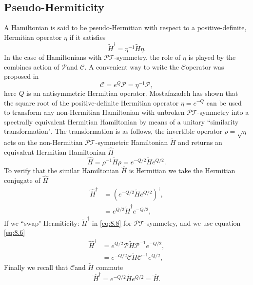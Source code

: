 \documentclass[12pt, a4paper]{report}
\newcommand\PT{\(\mathcal{PT}\)}
\newcommand\PP{\(\mathcal{P}\)}
\newcommand\CC{\(\mathcal{C}\)}
\begin{document}
\subsection{Pseudo-Hermiticity}\label{pseudo}
A Hamiltonian is said to be pseudo-Hermitian with respect to a positive-definite, Hermitian operator $\eta$ if it satisfies
\begin{equation}\label{eq:8.5}
\tilde{H}^{\dagger}  = \eta^{-1}\tilde{H}\eta.
\end{equation}
In the case of Hamiltonians with \PT-symmetry, the role of $\eta$ is played by the combines action of \PP\:and \CC. A convenient way to write the \CC\:operator was proposed in \cite{Bender_2006} 
\begin{equation}\label{eq:8.6}
\mathcal{C} = e^{Q}\mathcal{P} = \eta^{-1}\mathcal{P} ,
\end{equation}
here $Q$ is an antisymmetric Hermitian operator. Mostafazadeh \cite{Mostafazadeh2} has shown that the square root of the positive-definite Hermitian operator $\eta = e^{-Q}$ can be used to transform any non-Hermitian Hamiltonian with unbroken \PT-symmetry into a spectrally equivalent Hermitian Hamiltonian by means of a unitary ``similarity transformation"\cite{PTvsDH, Jones_2005}. The transformation is as follows, the invertible operator $\rho = \sqrt{\eta}$ acts on the non-Hermitian \PT-symmetric Hamiltonian $\tilde{H}$ and returns an equivalent Hermitian Hamiltonian $\hat{H}$
\begin{equation}\label{eq:8.7}
\hat{H} = \rho^{-1}\tilde{H}\rho = e^{-Q/2}\tilde{H}e^{Q/2}.
\end{equation}
To verify that the similar Hamiltonian $\hat{H}$ is Hermitian we take the Hermitian conjugate of $\hat{H}$
\begin{align}\label{eq:8.8}
\hat{H}^{\dagger} &= (e^{-Q/2}\tilde{H}e^{Q/2})^{\dagger}\nonumber,\\
& = e^{Q/2}\tilde{H}^{\dagger}e^{-Q/2},
\end{align}
If we ``swap" Hermiticity: $\tilde{H}^{\dagger}$ in \ref{eq:8.8} for \PT-symmetry, and we use equation \ref{eq:8.6}
\begin{align}\label{eq:8.9}
\hat{H}^{\dagger} &= e^{Q/2}\mathcal{P}\tilde{H}\mathcal{P}^{-1}e^{-Q/2}\nonumber,\\
&= e^{-Q/2}\mathcal{C}\tilde{H}\mathcal{C}^{-1}e^{Q/2},
\end{align}
Finally we recall that \CC\:and $\tilde{H}$ commute
\begin{equation}\label{eq:8.10}
\hat{H}^{\dagger} = e^{-Q/2}\tilde{H}e^{Q/2} = \hat{H}.
\end{equation}
\end{document}
